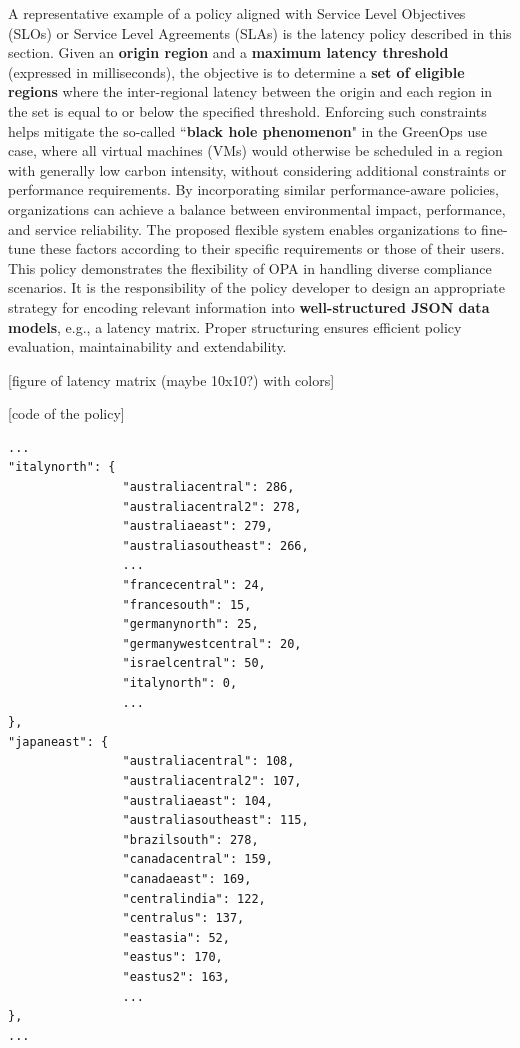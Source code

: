 A representative example of a policy aligned with Service Level Objectives (SLOs) or Service Level Agreements (SLAs) is the latency policy described in this section.
Given an \textbf{origin region} and a \textbf{maximum latency threshold} (expressed in milliseconds), the objective is to determine a \textbf{set of eligible regions} where the inter-regional latency between the origin and each region in the set is equal to or below the specified threshold.
Enforcing such constraints helps mitigate the so-called ``\textbf{black hole phenomenon}" in the GreenOps use case, where all virtual machines (VMs) would otherwise be scheduled in a region with generally low carbon intensity, without considering additional constraints or performance requirements. By incorporating similar performance-aware policies, organizations can achieve a balance between environmental impact, performance, and service reliability.
The proposed flexible system enables organizations to fine-tune these factors according to their specific requirements or those of their users. 
This policy demonstrates the flexibility of OPA in handling diverse compliance scenarios. It is the responsibility of the policy developer to design an appropriate strategy for encoding relevant information into \textbf{well-structured JSON data models}, e.g., a latency matrix. Proper structuring ensures efficient policy evaluation, maintainability and extendability.






[figure of latency matrix (maybe 10x10?) with colors]



[code of the policy]



\lstset{style=jsonstyle}
\begin{lstlisting}[caption={Latancy matrix example}, label={lst:latency_matrix_example}]
...
"italynorth": {
                "australiacentral": 286,
                "australiacentral2": 278,
                "australiaeast": 279,
                "australiasoutheast": 266,
                ...
                "francecentral": 24,
                "francesouth": 15,
                "germanynorth": 25,
                "germanywestcentral": 20,
                "israelcentral": 50,
                "italynorth": 0,
                ...
},
"japaneast": {
                "australiacentral": 108,
                "australiacentral2": 107,
                "australiaeast": 104,
                "australiasoutheast": 115,
                "brazilsouth": 278,
                "canadacentral": 159,
                "canadaeast": 169,
                "centralindia": 122,
                "centralus": 137,
                "eastasia": 52,
                "eastus": 170,
                "eastus2": 163,
                ...
},
...
\end{lstlisting}

